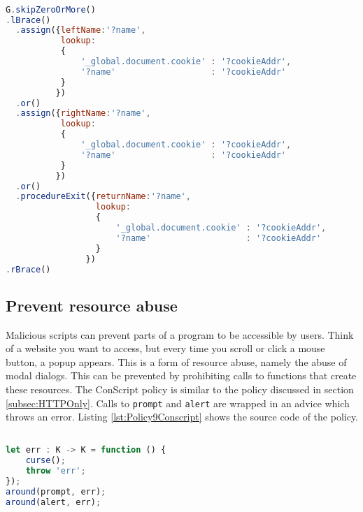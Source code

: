 \begin{lstlisting}[label={lst:Policy8JSQL},language=JavaScript,caption=Policy 8 in JS-QL,mathescape=true]  % float=t?

G.skipZeroOrMore()
.lBrace()
  .assign({leftName:'?name',
           lookup:
           {
               '_global.document.cookie' : '?cookieAddr',
               '?name'                   : '?cookieAddr' 
           }
          })
  .or()
  .assign({rightName:'?name',
           lookup:
           {
               '_global.document.cookie' : '?cookieAddr',
               '?name'                   : '?cookieAddr' 
           }
          })
  .or()
  .procedureExit({returnName:'?name',
                  lookup:
                  {
                      '_global.document.cookie' : '?cookieAddr',
                      '?name'                   : '?cookieAddr'  
                  }
                })
.rBrace()
\end{lstlisting}



\subsection{Prevent resource abuse}

Malicious scripts can prevent parts of a program to be accessible by users. Think of a website you want to access, but every time you scroll or click a mouse button, a popup appears. This is a form of resource abuse, namely the abuse of modal dialogs. This can be prevented by prohibiting calls to functions that create these resources. The ConScript policy is similar to the policy discussed in section \ref{subsec:HTTPOnly}. Calls to \texttt{prompt} and \texttt{alert} are wrapped in an advice which throws an error. Listing \ref{lst:Policy9Conscript} shows the source code of the policy.

\begin{lstlisting}[label={lst:Policy9Conscript},language=JavaScript,caption=Policy 9 in ConScript,mathescape=true]  % float=t?

let err : K -> K = function () { 
    curse(); 
    throw 'err'; 
}); 
around(prompt, err); 
around(alert, err);
\end{lstlisting}

